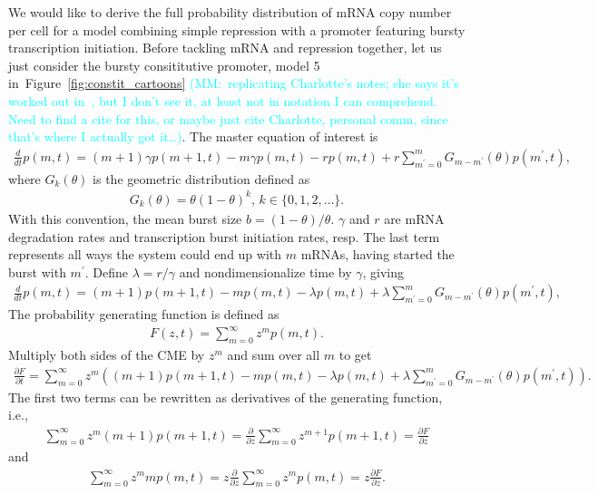 \documentclass[12pt]{article}%
\newcommand{\mmnote}[1]{\textcolor{cyan}{(MM:~#1)}}
\newcommand{\deriv}[2][{}]{\frac{d #1}{d #2}}
\newcommand{\pderiv}[2][{}]{\frac{\partial #1}{\partial #2}}
\newcommand{\fig}[1]{Figure~\ref{#1}}
\begin{document}
We would like to derive the full probability distribution of
mRNA copy number per cell for a model combining simple repression
with a promoter featuring bursty transcription initiation.
Before tackling mRNA and repression together, let us
just consider the bursty consititutive promoter,
model 5 in~\fig{fig:constit_cartoons}
\mmnote{replicating Charlotte's notes; she says it's worked out
in~\cite{Paulsson2000}, but I don't see it, at least not in notation I can
comprehend. Need to find a cite for this,
or maybe just cite Charlotte, personal comm, since that's where I actually got it\dots}.
The master equation of interest is
\begin{align}
\deriv{t}p(m,t) = (m+1)\gamma p(m+1,t) - m\gamma p(m,t) - r p(m,t)
        + r \sum_{m^\prime=0}^m G_{m-m^\prime}(\theta) p(m^\prime,t),
\label{eq:1state_unreg_003}
\end{align}
where $G_{k}(\theta)$ is the geometric distribution defined as
\begin{align}
G_{k}(\theta) = \theta(1 - \theta)^k, \, k\in\{0,1,2,\dots\}.
\end{align}
With this convention, the mean burst size $b = (1-\theta)/\theta$.
$\gamma$ and $r$ are mRNA degradation rates and transcription burst
initiation rates, resp. The last term represents all ways the system could
end up with $m$ mRNAs, having started the burst with $m^\prime$. Define
$\lambda = r/\gamma$ and nondimensionalize time by $\gamma$, giving
\begin{align}
\deriv{t}p(m,t) = (m+1)p(m+1,t) - m p(m,t) - \lambda p(m,t)
        + \lambda \sum_{m^\prime=0}^m G_{m-m^\prime}(\theta) p(m^\prime,t),
\end{align}
The probability generating function is defined as
\begin{align}
F(z,t) = \sum_{m=0}^\infty z^m p(m,t).
\end{align}
Multiply both sides of the CME by $z^m$ and sum over all $m$ to get
\begin{align}
\pderiv[F]{t} = \sum_{m=0}^\infty z^m
\left(
(m+1)p(m+1,t) - m p(m,t) - \lambda p(m,t)
+ \lambda \sum_{m^\prime=0}^m G_{m-m^\prime}(\theta) p(m^\prime,t)
\right).
\end{align}
The first two terms can be rewritten as derivatives of the
generating function, i.e.,
\begin{align}
\sum_{m=0}^\infty z^m (m+1)p(m+1,t)
=
\pderiv{z} \sum_{m=0}^\infty z^{m+1} p(m+1,t)
=
\pderiv[F]{z}
\end{align}
and
\begin{align}
\sum_{m=0}^\infty z^m mp(m,t)
=
z\pderiv{z} \sum_{m=0}^\infty z^m p(m,t)
=
z\pderiv[F]{z}.
\end{align}
\end{document}
